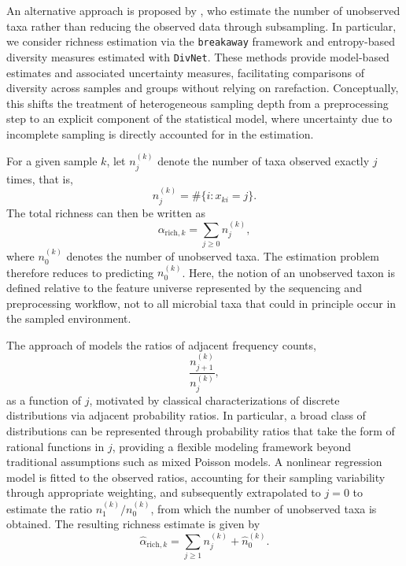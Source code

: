 An alternative approach is proposed by \citet{willis2015estimating}, who estimate the number of unobserved taxa rather than reducing the observed data through subsampling. In particular, we consider richness estimation via the \texttt{breakaway} framework and entropy-based diversity measures estimated with \texttt{DivNet}. These methods provide model-based estimates and associated uncertainty measures, facilitating comparisons of diversity across samples and groups without relying on rarefaction. Conceptually, this shifts the treatment of heterogeneous sampling depth from a preprocessing step to an explicit component of the statistical model, where uncertainty due to incomplete sampling is directly accounted for in the estimation.

For a given sample $k$, let $n_j^{(k)}$ denote the number of taxa observed exactly $j$ times, that is,
\begin{equation}
n_j^{(k)} = \#\{i : x_{ki} = j\}.
\end{equation}
The total richness can then be written as
\begin{equation}
\alpha_{\mathrm{rich}, k} = \sum_{j \geq 0} n_j^{(k)},
\end{equation}
where $n_0^{(k)}$ denotes the number of unobserved taxa. The estimation problem therefore reduces to predicting $n_0^{(k)}$. Here, the notion of an unobserved taxon is defined relative to the feature universe represented by the sequencing and preprocessing workflow, not to all microbial taxa that could in principle occur in the sampled environment.

The approach of \citet{willis2015estimating} models the ratios of adjacent frequency counts,
\begin{equation}
\frac{n_{j+1}^{(k)}}{n_j^{(k)}},
\end{equation}
as a function of $j$, motivated by classical characterizations of discrete distributions via adjacent probability ratios. In particular, a broad class of distributions can be represented through probability ratios that take the form of rational functions in $j$, providing a flexible modeling framework beyond traditional assumptions such as mixed Poisson models. A nonlinear regression model is fitted to the observed ratios, accounting for their sampling variability through appropriate weighting, and subsequently extrapolated to $j = 0$ to estimate the ratio $n_1^{(k)} / n_0^{(k)}$, from which the number of unobserved taxa is obtained. The resulting richness estimate is given by
\begin{equation}
\hat{\alpha}_{\mathrm{rich}, k} = \sum_{j \geq 1} n_j^{(k)} + \hat{n}_0^{(k)}.
\end{equation}

